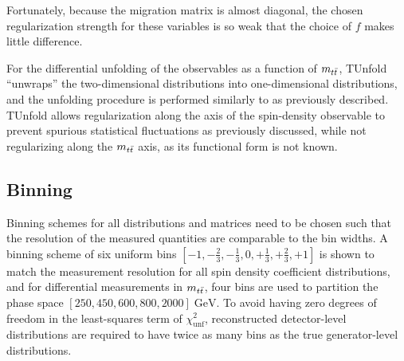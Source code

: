 Fortunately, because the migration matrix is almost diagonal, the chosen regularization strength for these variables is so weak that the choice of $f$ makes little difference. 

For the differential unfolding of the observables as a function of $m_{t\bar{t}}$, TUnfold ``unwraps'' the two-dimensional distributions into one-dimensional distributions, and the unfolding procedure is performed similarly to as previously described. 
TUnfold allows regularization along the axis of the spin-density observable to prevent spurious statistical fluctuations as previously discussed, while not regularizing along the $m_{t\bar{t}}$ axis, as its functional form is not known.


\subsection{Binning}
\label{Binning}
Binning schemes for all distributions and matrices need to be chosen such that the resolution of the measured quantities are comparable to the bin widths.
A binning scheme of six uniform bins $[-1,-\frac{2}{3},-\frac{1}{3},0,+\frac{1}{3},+\frac{2}{3},+1]$ is shown to match the measurement resolution for all spin density coefficient distributions, and for differential measurements in $m_{t\bar{t}}$, four bins are used to partition the phase space $[250,450,600,800,2000] \; \si{\GeV}$.
To avoid having zero degrees of freedom in the least-squares term of $\chi^{2}_{\text{unf}}$, reconstructed detector-level distributions are required to have twice as many bins as the true generator-level distributions.

